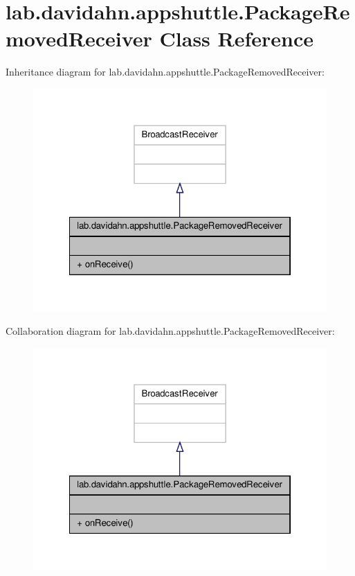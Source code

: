 \hypertarget{classlab_1_1davidahn_1_1appshuttle_1_1_package_removed_receiver}{\section{lab.\-davidahn.\-appshuttle.\-Package\-Removed\-Receiver \-Class \-Reference}
\label{classlab_1_1davidahn_1_1appshuttle_1_1_package_removed_receiver}
}


\-Inheritance diagram for lab.\-davidahn.\-appshuttle.\-Package\-Removed\-Receiver\-:
\nopagebreak
\begin{figure}[H]
\begin{center}
\leavevmode
\includegraphics[width=322pt]{classlab_1_1davidahn_1_1appshuttle_1_1_package_removed_receiver__inherit__graph}
\end{center}
\end{figure}


\-Collaboration diagram for lab.\-davidahn.\-appshuttle.\-Package\-Removed\-Receiver\-:
\nopagebreak
\begin{figure}[H]
\begin{center}
\leavevmode
\includegraphics[width=322pt]{classlab_1_1davidahn_1_1appshuttle_1_1_package_removed_receiver__coll__graph}
\end{center}
\end{figure}
